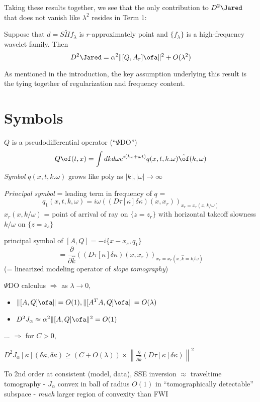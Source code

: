 Taking these results together, we see that the only contribution to $D^2\Jared$ that does not vanish like $\lambda^2$ resides in Term 1:

\begin{theorem}
\label{d2j}
Suppose that $d=S\tilde{\Pi}f_{\lambda}$ is $r$-approximately point and $\{f_{\lambda}\}$ is a high-frequency wavelet family. Then
\[
D^2\Jared = \alpha^2\|[Q,A_r]\ofa\|^2 + O(\lambda^2)
\]
\end{theorem}

\begin{remark}
As mentioned in the introduction, the key assumption underlying this result is the tying together of regularization and frequency content.
\end{remark}

\section{Symbols}

$Q$ is a pseudodifferential operator (``$\Psi$DO'') 
\[
Q\of(t,x) = \int dk d\omega e^{i(kx+\omega t)}q(x,t,k.\omega) \hat{\of}(k,\omega)
\]
{\em Symbol} $q(x,t,k.\omega)$ grows like poly as $|k|,|\omega| \rightarrow \infty$

{\em Principal symbol} = leading term in frequency of $q$ = 
\[
q_1(x,t,k,\omega) = i\omega \left((D\tau[\kappa]\delta \kappa)(x,x_r)\right)_{x_r=x_r(x,k/\omega)}
\]
$x_r(x,k/\omega)$ = point of arrival of ray on $\{z=z_r\}$ with horizontal takeoff slowness $k/\omega$ on $\{z=z_s\}$

principal symbol of $[A,Q]= -i\{x-x_s,q_1\} $
\[
=\frac{\partial}{\partial \hat{k}}\left((D\tau[\kappa]\delta \kappa)(x,x_r)\right)_{x_r=x_r(x,\hat{k}=k/\omega)}
\]
(= linearized modeling operator of {\em slope tomography})


$\Psi$DO calculus $\Rightarrow$ as $\lambda \rightarrow 0$,
\begin{itemize}
\item $\|[A,Q]\ofa\|=O(1), \|[A^TA,Q]\ofa\|=O(\lambda)$ 
\item $D^2J_{\alpha} \approx \alpha^2 \|[A,Q]\ofa\|^2 = O(1)$
\end{itemize}


... $\Rightarrow$  for $C>0$,

$D^2J_{\alpha}[\kappa](\delta \kappa,\delta \kappa) \ge (C+ O(\lambda)) \times \left\|\frac{\partial}{\partial \hat{k}}(D\tau[\kappa]\delta \kappa)\right\|^2 $

{\color{blue} To 2nd order at consistent (model, data), SSE inversion
  $\approx$ traveltime tomography - $J_{\alpha}$ convex in ball of
  radius $O(1)$ in ``tomographically detectable'' subspace - {\em
    much} larger region of convexity than FWI}

